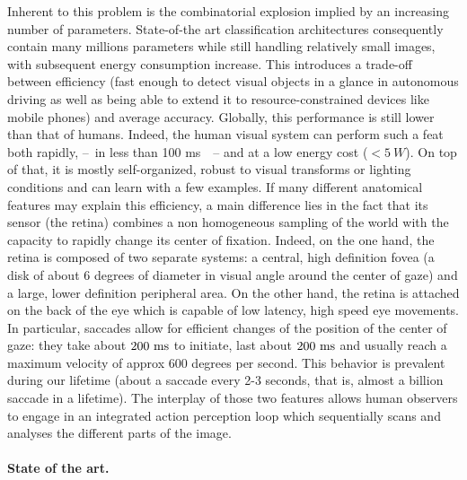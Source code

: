 \ICANN
Inherent to this problem is the combinatorial explosion implied by an increasing number of parameters. State-of-the art classification architectures consequently contain many millions parameters while still handling relatively small images, with subsequent energy consumption increase. This introduces a trade-off between efficiency (fast enough to detect visual objects in a glance in autonomous driving as well as being able to extend it to resource-constrained devices like mobile phones) and average accuracy. Globally, this performance is  still lower than that of humans. Indeed, the human visual system can perform such a feat both rapidly, --~in less than 100 ms~\citep{Kirchner06}~-- and at a low energy cost ($<5~W$). On top of that, it is mostly self-organized, robust to visual transforms or lighting conditions and can learn with a few examples. If many different anatomical features may explain this efficiency, a main difference lies in the fact that its sensor (the retina) combines a non homogeneous sampling of the world with the capacity to rapidly change its center of fixation. Indeed, on the one hand, the retina is composed of two separate systems: a central, high definition fovea (a disk of about 6 degrees of diameter in visual angle around the center of gaze) and a large, lower definition peripheral area. On the other hand, the retina is attached on the back of the eye which is capable of low latency, high speed eye movements.  In particular, saccades allow for efficient changes of the position of the center of gaze: they take about $200~\si{\milli\second}$ to initiate, last about $200~\si{\milli\second}$ and usually reach a maximum velocity of approx 600 degrees per second. This behavior is prevalent during our lifetime (about a saccade every 2-3 seconds, that is, almost a billion saccade in a lifetime).  The interplay of those two features allows human observers to engage in an integrated action perception loop which sequentially scans and analyses the different parts of the image.
%
\paragraph{State of the art.}
\fi

